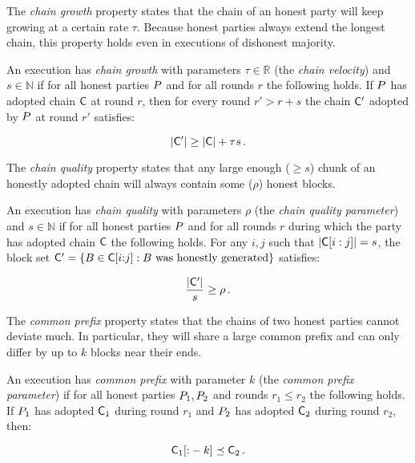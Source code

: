 The \emph{chain growth} property states that the chain of an honest party will
keep growing at a certain rate $\tau$. Because honest parties always extend the
longest chain, this property holds even in executions of dishonest majority.

\begin{definition}
  An execution has \emph{chain growth} with parameters $\tau \in \mathbb{R}$
  (the \emph{chain velocity}) and $s \in \mathbb{N}$ if for all honest parties
  $P$ and for all rounds $r$ the following holds. If $P$ has adopted
  chain $\mathsf{C}$ at round $r$, then for every round $r' > r + s$ the chain
  $\mathsf{C}'$ adopted by $P$ at round $r'$ satisfies:

  \[
  |\mathsf{C}'| \geq |\mathsf{C}| + \tau s
  \,.
  \]
\end{definition}

The \emph{chain quality} property states that any large enough ($\geq s$) chunk
of an honestly adopted chain will always contain some ($\rho$) honest blocks.

\begin{definition}
  An execution has \emph{chain quality} with parameters $\rho$ (the
  \emph{chain quality parameter}) and $s \in \mathbb{N}$ if for all honest
  parties $P$ and for all rounds $r$ during which the party has adopted
  chain $\mathsf{C}$ the following holds. For any $i, j$ such that
  $|\mathsf{C}[i:j]| = s$,
  the block set
  $\mathsf{C}' = \{B \in \mathsf{C}[i{:}j]: B \text{ was honestly generated}\}$ satisfies:

  \[
  \frac{|\mathsf{C}'|}{s} \geq \rho
  \,.
  \]
\end{definition}

The \emph{common prefix} property states that the chains of two honest parties
cannot deviate much. In particular, they will share a large common prefix and
can only differ by up to $k$ blocks near their ends.

\begin{definition}
  An execution has \emph{common prefix} with parameter $k$ (the \emph{common
  prefix parameter}) if for all honest parties $P_1, P_2$ and rounds
  $r_1 \leq r_2$ the following holds. If $P_1$ has adopted $\mathsf{C}_1$
  during round $r_1$ and $P_2$ has adopted $\mathsf{C}_2$ during round $r_2$,
  then:

  \[
  \mathsf{C}_1[{:}-k] \preceq \mathsf{C}_2
  \,.
  \]
\end{definition}

